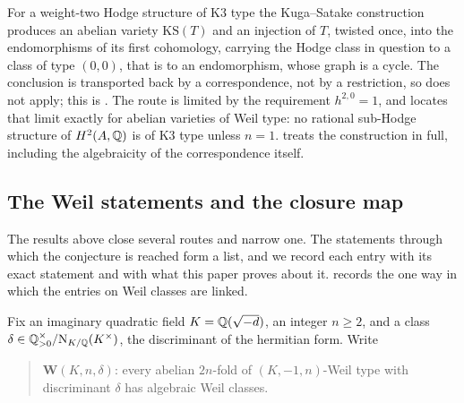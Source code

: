\begin{remark}\label{rem:ksscope}
For a weight-two Hodge structure of K3 type the Kuga--Satake construction
produces an abelian variety $\mathrm{KS}(T)$ and an injection of $T$, twisted
once, into the endomorphisms of its first cohomology, carrying the Hodge class
in question to a class of type $(0,0)$, that is to an endomorphism, whose graph
is a cycle. The conclusion is transported back by a correspondence, not by a
restriction, so  does not apply; this is
. The route is limited by the requirement
$h^{2,0}=1$, and  locates that limit exactly for abelian
varieties of Weil type: no rational sub-Hodge structure of $H^{2}(A,\mathbb{Q})$ is of
K3 type unless $n=1$.  treats the construction in full, including
the algebraicity of the correspondence itself.
\end{remark}

\subsection{The Weil statements and the closure map}
\label{ssec:closuremap}

The results above close several routes and narrow one. The statements
through which the conjecture is reached form a list, and we record each
entry with its exact statement and with what this paper proves about it.
 records the one way in which the entries on Weil classes
are linked.

Fix an imaginary quadratic field $K=\mathbb{Q}(\sqrt{-d})$, an integer $n\ge2$, and a
class $\delta\in\mathbb{Q}^{\times}_{>0}/\mathrm{N}_{K/\mathbb{Q}}(K^{\times})$, the discriminant of the
hermitian form. Write
\begin{quote}
$\mathbf{W}(K,n,\delta)$: every abelian $2n$-fold of $(K,-1,n)$-Weil type with
discriminant $\delta$ has algebraic Weil classes.
\end{quote}

